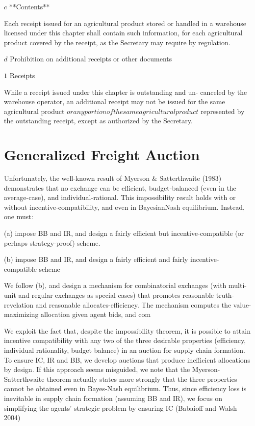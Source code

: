 \documentclass{article}
\begin{document}
\(c\) **Contents**

Each receipt issued for an agricultural product stored or handled in a warehouse licensed under this chapter shall contain such information, for each agricultural product covered by the receipt, as the Secretary may require by regulation.

\(d\) Prohibition on additional receipts or other documents

\(1\) Receipts

While a receipt issued under this chapter is outstanding and un- canceled by the warehouse operator, an additional receipt may not be issued for the same agricultural product \(or any portion of the same agricultural product\) represented by the outstanding receipt, except as authorized by the Secretary.




\section{Generalized Freight Auction }

Unfortunately, the well-known result of Myerson & Satterthwaite (1983) demonstrates that no exchange can be efficient, budget-balanced (even in the average-case), and individual-rational. This impossibility result holds with or without incentive-compatibility, and even in BayesianNash equilibrium. Instead, one must:

(a) impose BB and IR, and design a fairly efficient but incentive-compatible (or perhaps strategy-proof) scheme.

(b) impose BB and IR, and design a fairly efficient and fairly incentive-compatible scheme

We follow (b), and design a mechanism for combinatorial exchanges (with multi-unit and regular exchanges as special cases) that promotes reasonable truth-revelation and reasonable allocates-efficiency. The mechanism computes the value-maximizing allocation given agent bids, and com

We exploit the fact that, despite the impossibility theorem, it is possible to attain incentive compatibility with any two of the three desirable properties (efficiency, individual rationality, budget balance) in an auction for supply chain formation. To ensure IC, IR and BB, we develop auctions that produce inefficient allocations by design. If this approach seems misguided, we note that the Myerson-Satterthwaite theorem actually states more strongly that the three properties cannot be obtained even in Bayes-Nash equilibrium. Thus, since efficiency loss is inevitable in supply chain formation (assuming BB and IR), we focus on simplifying the agents’ strategic problem by ensuring IC (Babaioff and Walsh 2004)
\end{document}
